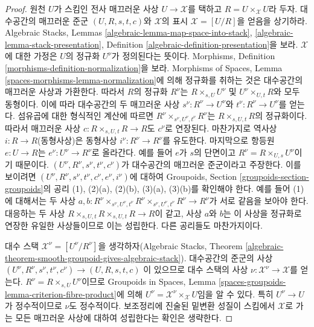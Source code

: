 \begin{proof}
원천 $U$가 스킴인 전사 매끄러운 사상 $U \to \mathcal{X}$를 택하고
$R = U \times_\mathcal{X} U$라 두자. 대수공간의 매끄러운 준군
$(U, R, s, t, c)$와 $\mathcal{X}$의 표시
$\mathcal{X} = [U/R]$을 얻음을 상기하라. Algebraic Stacks, Lemmas
\ref{algebraic-lemma-map-space-into-stack},
\ref{algebraic-lemma-stack-presentation}, Definition
\ref{algebraic-definition-presentation}을 보라. $\mathcal{X}$에 대한 가정은
$U$의 정규화 $U^\nu$가 정의된다는 뜻이다. Morphisms, Definition
\ref{morphisms-definition-normalization}을 보라. Morphisms of Spaces, Lemma
\ref{spaces-morphisms-lemma-normalization}에 의해 정규화를 취하는 것은
대수공간의 매끄러운 사상과 가환한다. 따라서 $R$의 정규화 $R^\nu$는
$R \times_{s, U} U^\nu$ 및 $U^\nu \times_{U, t} R$와 모두 동형이다.
이에 따라 대수공간의 두 매끄러운 사상
$s^\nu : R^\nu \to U^\nu$와 $t^\nu : R^\nu \to U^\nu$를 얻는다.
섬유곱에 대한 형식적인 계산에 따르면
$R^\nu \times_{s^\nu, U^\nu, t^\nu} R^\nu$는
$R \times_{s, U, t} R$의 정규화이다. 따라서 매끄러운 사상
$c : R \times_{s, U, t} R \to R$도 $c^\nu$로 연장된다. 마찬가지로
역사상 $i : R \to R$(동형사상)은 동형사상
$i^\nu : R^\nu \to R^\nu$를 유도한다. 마지막으로 항등원
$e : U \to R$는 $e^\nu : U^\nu \to R^\nu$로 올라간다. 예를 들어
$e$가 $s$의 단면이고 $R^\nu = R \times_{U, s} U^\nu$이기 때문이다.
$(U^\nu, R^\nu, s^\nu, t^\nu, c^\nu)$가 대수공간의 매끄러운 준군이라고
주장한다. 이를 보이려면
$(U^\nu, R^\nu, s^\nu, t^\nu, c^\nu, e^\nu, i^\nu)$에 대하여
Groupoids, Section \ref{groupoids-section-groupoids}의 공리 (1), (2)(a),
(2)(b), (3)(a), (3)(b)를 확인해야 한다. 예를 들어 (1)에 대해서는 두
사상
$a, b : R^\nu \times_{s^\nu, U^\nu, t^\nu} R^\nu
\times_{s^\nu, U^\nu, t^\nu} R^\nu \to R^\nu$가 서로 같음을 보아야 한다.
대응하는 두 사상
$R \times_{s, U, t} R \times_{s, U, t} R \to R$이 같고, 사상 $a$와
$b$는 이 사상을 정규화로 연장한 유일한 사상들이므로 이는 성립한다. 다른
공리들도 마찬가지이다.

\medskip\noindent
대수 스택 $\mathcal{X}^\nu = [U^\nu/R^\nu]$을 생각하자(Algebraic Stacks,
Theorem \ref{algebraic-theorem-smooth-groupoid-gives-algebraic-stack}).
대수공간의 준군의 사상
$(U^\nu, R^\nu, s^\nu, t^\nu, c^\nu) \to (U, R, s, t, c)$
이 있으므로 대수 스택의 사상
$\nu : \mathcal{X}^\nu \to \mathcal{X}$를 얻는다.
$R^\nu = R \times_{s, U} U^\nu$이므로 Groupoids in Spaces, Lemma
\ref{spaces-groupoids-lemma-criterion-fibre-product}에 의해
$U^\nu = \mathcal{X}^\nu \times_\mathcal{X} U$임을 알 수 있다. 특히
$U^\nu \to U$가 정수적이므로 $\nu$도 정수적이다. 보조정리에 진술된
밑변환 성질이 스킴에서 $\mathcal{X}$로 가는 모든 매끄러운 사상에 대하여
성립한다는 확인은 생략한다.
\end{proof}

